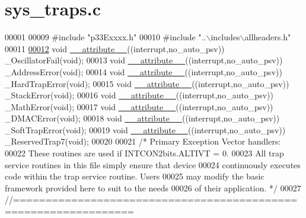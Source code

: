 \hypertarget{a00070_source}{\section{sys\+\_\+traps.\+c}
\label{a00070_source}
}

\begin{DoxyCode}
00001 
00009 \textcolor{preprocessor}{#include "p33Exxxx.h"}
00010 \textcolor{preprocessor}{#include "..\(\backslash\)includes\(\backslash\)allheaders.h"} 
00011 
\hypertarget{a00070_source_l00012}{}\hyperlink{a00070_a226557d5e42f7e29ddaff30606138459}{00012} \textcolor{keywordtype}{void} \hyperlink{a00070_a226557d5e42f7e29ddaff30606138459}{\_\_attribute\_\_}((interrupt,no\_auto\_psv)) \_OscillatorFail(\textcolor{keywordtype}{void});
00013 \textcolor{keywordtype}{void} \hyperlink{a00070_a226557d5e42f7e29ddaff30606138459}{\_\_attribute\_\_}((interrupt,no\_auto\_psv)) \_AddressError(\textcolor{keywordtype}{void});
00014 \textcolor{keywordtype}{void} \hyperlink{a00070_a226557d5e42f7e29ddaff30606138459}{\_\_attribute\_\_}((interrupt,no\_auto\_psv)) \_HardTrapError(\textcolor{keywordtype}{void});
00015 \textcolor{keywordtype}{void} \hyperlink{a00070_a226557d5e42f7e29ddaff30606138459}{\_\_attribute\_\_}((interrupt,no\_auto\_psv)) \_StackError(\textcolor{keywordtype}{void});
00016 \textcolor{keywordtype}{void} \hyperlink{a00070_a226557d5e42f7e29ddaff30606138459}{\_\_attribute\_\_}((interrupt,no\_auto\_psv)) \_MathError(\textcolor{keywordtype}{void});
00017 \textcolor{keywordtype}{void} \hyperlink{a00070_a226557d5e42f7e29ddaff30606138459}{\_\_attribute\_\_}((interrupt,no\_auto\_psv)) \_DMACError(\textcolor{keywordtype}{void});
00018 \textcolor{keywordtype}{void} \hyperlink{a00070_a226557d5e42f7e29ddaff30606138459}{\_\_attribute\_\_}((interrupt,no\_auto\_psv)) \_SoftTrapError(\textcolor{keywordtype}{void});
00019 \textcolor{keywordtype}{void} \hyperlink{a00070_a226557d5e42f7e29ddaff30606138459}{\_\_attribute\_\_}((interrupt,no\_auto\_psv)) \_ReservedTrap7(\textcolor{keywordtype}{void});
00020 
00021 \textcolor{comment}{/* Primary Exception Vector handlers:}
00022 \textcolor{comment}{These routines are used if INTCON2bits.ALTIVT = 0.}
00023 \textcolor{comment}{All trap service routines in this file simply ensure that device}
00024 \textcolor{comment}{continuously executes code within the trap service routine. Users}
00025 \textcolor{comment}{may modify the basic framework provided here to suit to the needs}
00026 \textcolor{comment}{of their application. */}
00027 \textcolor{comment}{//================================================================}

\end{DoxyCode}
